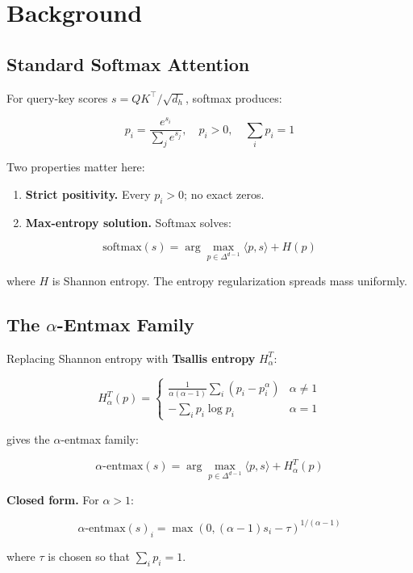 
\section{Background}

\subsection{Standard Softmax Attention}

For query-key scores $s = Q K^\top / \sqrt{d_h}$, softmax produces:

\[
p_i = \frac{e^{s_i}}{\sum_j e^{s_j}}, \quad p_i > 0, \quad \sum_i p_i = 1
\tag{3.1}
\]

Two properties matter here:

\begin{enumerate}
\item \textbf{Strict positivity.} Every $p_i > 0$; no exact zeros.
\item \textbf{Max-entropy solution.} Softmax solves:

\end{enumerate}
\[
\text{softmax}(s) = \arg\max_{p \in \Delta^{d-1}} \langle p, s \rangle + H(p)
\tag{3.2}
\]

where $H$ is Shannon entropy. The entropy regularization spreads mass 
uniformly.

\subsection{The $\alpha$-Entmax Family}

Replacing Shannon entropy with \textbf{Tsallis entropy} $H_\alpha^T$:

\[
H_\alpha^T(p) = \begin{cases}
\frac{1}{\alpha (\alpha - 1)} \sum_i (p_i - p_i^\alpha) & \alpha \neq 1 \\
-\sum_i p_i \log p_i & \alpha = 1
\end{cases}
\tag{3.3}
\]

gives the $\alpha$-entmax family:

\[
\text{$\alpha$-entmax}(s) = \arg\max_{p \in \Delta^{d-1}} \langle p, s \rangle + H_\alpha^T(p)
\tag{3.4}
\]

\textbf{Closed form.} For $\alpha > 1$:

\[
\text{$\alpha$-entmax}(s)_i = \max\!\left(0, (\alpha - 1) s_i - \tau\right)^{1/(\alpha - 1)}
\tag{3.5}
\]

where $\tau$ is chosen so that $\sum_i p_i = 1$.

